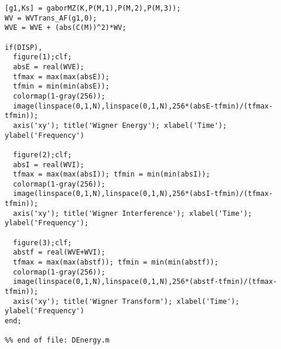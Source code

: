 \begin{small}
\begin{verbatim}
[g1,Ks] = gaborMZ(K,P(M,1),P(M,2),P(M,3));
WV = WVTrans_AF(g1,0);
WVE = WVE + (abs(C(M))^2)*WV;

if(DISP),
  figure(1);clf;
  absE = real(WVE);
  tfmax = max(max(absE));
  tfmin = min(min(absE));
  colormap(1-gray(256));
  image(linspace(0,1,N),linspace(0,1,N),256*(absE-tfmin)/(tfmax-tfmin));
  axis('xy'); title('Wigner Energy'); xlabel('Time'); ylabel('Frequency')

  figure(2);clf;
  absI = real(WVI);
  tfmax = max(max(absI)); tfmin = min(min(absI));
  colormap(1-gray(256));
  image(linspace(0,1,N),linspace(0,1,N),256*(absI-tfmin)/(tfmax-tfmin));
  axis('xy'); title('Wigner Interference'); xlabel('Time'); ylabel('Frequency');

  figure(3);clf;  
  abstf = real(WVE+WVI);
  tfmax = max(max(abstf)); tfmin = min(min(abstf));
  colormap(1-gray(256));
  image(linspace(0,1,N),linspace(0,1,N),256*(abstf-tfmin)/(tfmax-tfmin));
  axis('xy'); title('Wigner Transform'); xlabel('Time'); ylabel('Frequency')
end;

%% end of file: DEnergy.m
\end{verbatim}\end{small}

